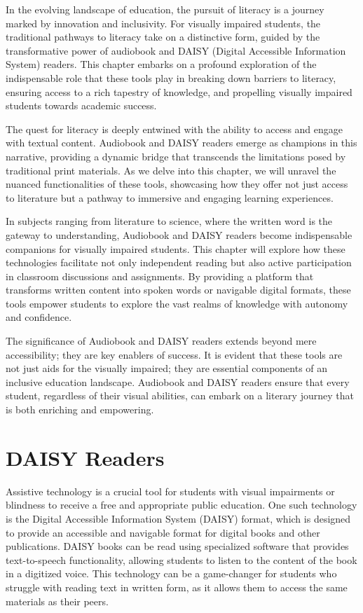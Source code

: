 In the evolving landscape of education, the pursuit of literacy is a journey marked by innovation and inclusivity. For visually impaired students, the traditional pathways to literacy take on a distinctive form, guided by the transformative power of audiobook and DAISY (Digital Accessible Information System) readers. This chapter embarks on a profound exploration of the indispensable role that these tools play in breaking down barriers to literacy, ensuring access to a rich tapestry of knowledge, and propelling visually impaired students towards academic success.

The quest for literacy is deeply entwined with the ability to access and engage with textual content. Audiobook and DAISY readers emerge as champions in this narrative, providing a dynamic bridge that transcends the limitations posed by traditional print materials. As we delve into this chapter, we will unravel the nuanced functionalities of these tools, showcasing how they offer not just access to literature but a pathway to immersive and engaging learning experiences.

In subjects ranging from literature to science, where the written word is the gateway to understanding, Audiobook and DAISY readers become indispensable companions for visually impaired students. This chapter will explore how these technologies facilitate not only independent reading but also active participation in classroom discussions and assignments. By providing a platform that transforms written content into spoken words or navigable digital formats, these tools empower students to explore the vast realms of knowledge with autonomy and confidence.

The significance of Audiobook and DAISY readers extends beyond mere accessibility; they are key enablers of success. It is evident that these tools are not just aids for the visually impaired; they are essential components of an inclusive education landscape. Audiobook and DAISY readers ensure that every student, regardless of their visual abilities, can embark on a literary journey that is both enriching and empowering.

\pagebreak \hypertarget{text-to-speech-music-podcast}{}\section{DAISY Readers}\label{text-to-speech-music-podcast}

Assistive technology is a crucial tool for students with visual impairments or blindness to receive a free and appropriate public education. One such technology is the Digital Accessible Information System (DAISY) format, which is designed to provide an accessible and navigable format for digital books and other publications. DAISY books can be read using specialized software that provides text-to-speech functionality, allowing students to listen to the content of the book in a digitized voice. This technology can be a game-changer for students who struggle with reading text in written form, as it allows them to access the same materials as their peers.

